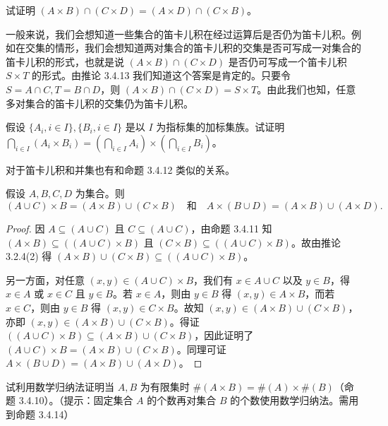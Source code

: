 \begin{question}
试证明 $(A \times B) \cap (C \times D) = (A \times D) \cap (C \times B)$。
\end{question}

一般来说，我们会想知道一些集合的笛卡儿积在经过运算后是否仍为笛卡儿积。例如在交集的情形，我们会想知道两对集合的笛卡儿积的交集是否可写成一对集合的笛卡儿积的形式，也就是说 $(A \times B) \cap (C \times D)$ 是否仍可写成一个笛卡儿积 $S \times T$ 的形式。由推论 3.4.13 我们知道这个答案是肯定的。只要令 $S = A \cap C, T = B \cap D$，则 $(A \times B) \cap (C \times D) = S \times T$。由此我们也知，任意多对集合的笛卡儿积的交集仍为笛卡儿积。

\begin{question}
假设 $\{A_i, i \in I\}, \{B_i, i \in I\}$ 是以 $I$ 为指标集的加标集族。试证明 $\bigcap_{i \in I} (A_i \times B_i) = (\bigcap_{i \in I} A_i) \times (\bigcap_{i \in I} B_i)$。
\end{question}

对于笛卡儿积和并集也有和命题 3.4.12 类似的关系。

\begin{proposition}
假设 $A, B, C, D$ 为集合。则
$$ (A \cup C) \times B = (A \times B) \cup (C \times B) \quad \text{和} \quad A \times (B \cup D) = (A \times B) \cup (A \times D). $$
\end{proposition}

\begin{proof}
因 $A \subseteq (A \cup C)$ 且 $C \subseteq (A \cup C)$，由命题 3.4.11 知 $(A \times B) \subseteq ((A \cup C) \times B)$ 且 $(C \times B) \subseteq ((A \cup C) \times B)$。故由推论 3.2.4(2) 得 $(A \times B) \cup (C \times B) \subseteq ((A \cup C) \times B)$。

另一方面，对任意 $(x, y) \in (A \cup C) \times B$，我们有 $x \in A \cup C$ 以及 $y \in B$，得 $x \in A$ 或 $x \in C$ 且 $y \in B$。若 $x \in A$，则由 $y \in B$ 得 $(x, y) \in A \times B$，而若 $x \in C$，则由 $y \in B$ 得 $(x, y) \in C \times B$。故知 $(x, y) \in (A \times B) \cup (C \times B)$，亦即 $(x, y) \in (A \times B) \cup (C \times B)$。得证 $((A \cup C) \times B) \subseteq (A \times B) \cup (C \times B)$，因此证明了 $(A \cup C) \times B = (A \times B) \cup (C \times B)$。同理可证 $A \times (B \cup D) = (A \times B) \cup (A \times D)$。
\end{proof}

\begin{question}
试利用数学归纳法证明当 $A, B$ 为有限集时 $\#(A \times B) = \#(A) \times \#(B)$（命题 3.4.10）。（提示：固定集合 $A$ 的个数再对集合 $B$ 的个数使用数学归纳法。需用到命题 3.4.14）
\end{question}

